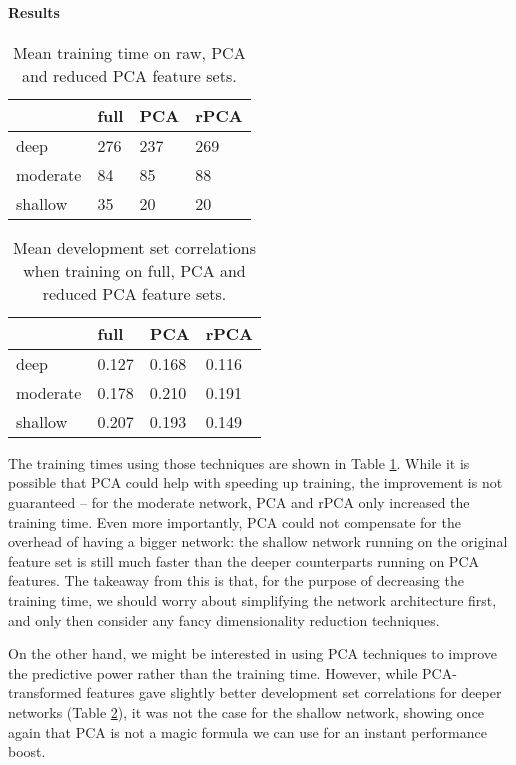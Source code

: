 \documentclass[10pt, twocolumn]{article}
\begin{document}

\paragraph{Results} 
\begin{table}[]
	\begin{tabularx}{\linewidth}{XXXX}
		\hline
				& \textbf{full} & \textbf{PCA} & \textbf{rPCA}\\ \hline
		deep    & 276   & 237  & 269 \\
		moderate  & 84 & 85 & 88 \\
		shallow & 35 & 20 & 20
		\end{tabularx}
\caption{Mean training time on raw, PCA and reduced PCA feature sets.}\label{g2}
\end{table}

\begin{table}[]
	\begin{tabularx}{\linewidth}{XXXX}
		\hline
				& \textbf{full} & \textbf{PCA} & \textbf{rPCA}\\ \hline
		deep    & 0.127   & 0.168  & 0.116 \\
		moderate  & 0.178 & 0.210 & 0.191 \\
		shallow & 0.207 & 0.193 & 0.149
		\end{tabularx}
\caption{Mean development set correlations when training on full, PCA and reduced PCA feature sets.}\label{g3}
\end{table}

The training times using those techniques are shown in Table \ref{g2}. While it is possible that PCA could help with speeding up training, the improvement is not guaranteed – for the moderate network, PCA and rPCA only increased the training time. Even more importantly, PCA could not compensate for the overhead of having a bigger network: the shallow network running on the original feature set is still much faster than the deeper counterparts running on PCA features. The takeaway from this is that, for the purpose of decreasing the training time, we should worry about simplifying the network architecture first, and only then consider any fancy dimensionality reduction techniques.

On the other hand, we might be interested in using PCA techniques to improve the predictive power rather than the training time. However, while PCA-transformed features gave slightly better development set correlations for deeper networks (Table \ref{g3}), it was not the case for the shallow network, showing once again that PCA is not a magic formula we can use for an instant performance boost.
\end{document}

